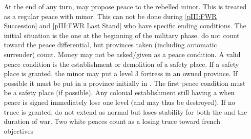 \begin{digressions}

  \phpaix
  \aparag At the end of any turn, \FRA may propose peace to the rebelled
  minor. This is treated as a regular peace with minor. This can not be done
  during \ref{pIII:FWR Succession} and \ref{pIII:FWR Last Stand} who have
  specific ending conditions.
  \bparag The initial situation is the one at the beginning of the military
  phase. \REVOLT do not count toward the peace differential, but provinces
  taken (including automatic surrender) count.
  \bparag Money may not be asked/given as a peace condition.
  \bparag A valid peace condition is the establishment or demolition of a
  safety place. If a safety place is granted, the minor may put a level 3
  fortress in an owned province. If possible it must be put in a province
  initially in \REVOLT \faceplus.
  \bparag The first peace condition must be a safety place (if possible).
  \bparag Any colonial establishment still having a \REVOLT when peace is
  signed immediately lose one level (and may thus be destroyed).
  \aparag If no truce is granted, \REVOLT do not extend as normal but \FRA
  loses stability for both the \REVOLT and the duration of war.
  \aparag Two white peaces count as a losing truce toward french objectives

\end{digressions}
